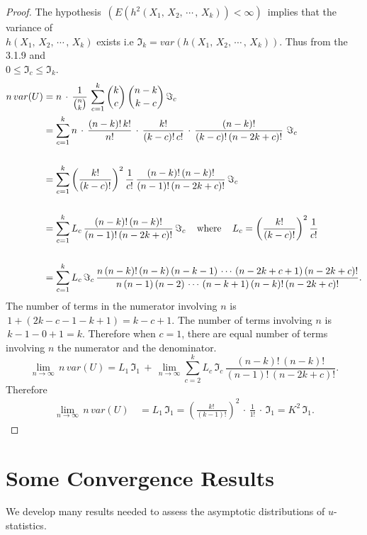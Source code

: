 \documentclass[12pt,a4paper]{report}
\theoremstyle{definition}
\theoremstyle{plain}
\begin{document}
\begin{proof}
The hypothesis $\, \left(E\left(h^2(X_1, \, X_2, \, \cdots\, , \, X_k)\right) < \infty\right)\,$ implies that the variance of\\ $h(X_1, \, X_2, \, \cdots\, , \, X_k)$ exists i.e $\Im_k = var\left(h(X_1, \, X_2, \, \cdots\, , \, X_k)\right)$. Thus from the 3.1.9 and\\ $0\leq \Im_c\leq \Im_k$. 
\begin{align*}
n\, var(U) & = n\, \cdot\, \frac{1}{\binom{n}{k}}\, \sum^k_{c = 1} \binom{k}{c}\, \binom{n - k}{k - c}\, \Im_c\\
& = \sum^k_{c = 1}n\, \cdot\, \frac{(n - k)!\, k!}{n!}\, \cdot\, \frac{k!}{(k - c)!\, c!}\, \cdot\, \frac{(n - k)!}{(k - c)!\, (n - 2k + c)!}\, \, \Im_c\\\\
& = \sum^k_{c = 1}\left(\frac{k!}{(k - c)!}\right)^2\frac{1}{c!}\, \frac{(n - k)!\, (n - k)!}{(n - 1)!\, (n - 2k + c)!}\, \Im_c\\\\
& = \sum^k_{c = 1} L_c\, \frac{(n - k)!\, (n-k)!}{(n - 1)!\, (n - 2k + c)!}\, \Im_c\hspace{0.4cm}\text{where}\hspace{0.4cm} L_c = \left(\frac{k!}{(k - c)!}\right)^2\frac{1}{c!}\\\\
& = \sum^k_{c = 1} L_c\, \Im_c\, \frac{n\, (n-k)!\, (n-k)\, (n-k - 1)\, \cdots\, (n-2k+c+1)\, (n-2k+ c)!}{n\,(n-1)\,(n-2)\, \cdots\, (n - k + 1)\,(n-k)!\, (n-2k+c)!} .
\end{align*}
The number of terms in the numerator involving $n$ is $\, 1 + (2k - c - 1 - k + 1) = k - c + 1$.
The number of terms involving $n$ is $\, k - 1 - 0 + 1 = k$. Therefore when $c = 1$, there are equal number of terms involving $n$ the numerator and the denominator.
$$\lim_{n\rightarrow\infty}\, n\, var(U) = L_1\, \Im_1 \,+ \, \lim_{n\rightarrow\infty}\sum^k_{c  = 2} L_c\, \Im_c\, \frac{(n - k)!\, (n - k)!}{(n - 1)!\, (n - 2k + c)!}.$$
Therefore
\begin{align*}
\lim_{n\rightarrow\infty}\, n \, var(U)\,  & = L_1\, \Im_1 = \left(\frac{k!}{(k - 1)!}\right)^2\, \cdot\, \frac{1}{1!}\, \cdot\, \Im_1
 = K^2\, \Im_1.
\end{align*}
\end{proof}



\section{Some Convergence Results}
We develop many results needed to assess the asymptotic distributions of $u$-statistics.
\end{document}
